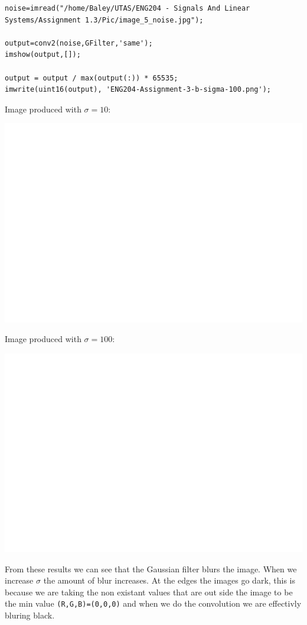 \documentclass[11pt]{article}
\begin{document}
\begin{verbatim}
noise=imread("/home/Baley/UTAS/ENG204 - Signals And Linear Systems/Assignment 1.3/Pic/image_5_noise.jpg");

output=conv2(noise,GFilter,'same');
imshow(output,[]);

output = output / max(output(:)) * 65535;
imwrite(uint16(output), 'ENG204-Assignment-3-b-sigma-100.png');
\end{verbatim}
Image produced with \(\sigma=10\):
\begin{center}
\includegraphics[width=.9\linewidth]{ENG204-Assignment-3-b-sigma-10.png}
\end{center}
Image produced with \(\sigma=100\):
\begin{center}
\includegraphics[width=.9\linewidth]{ENG204-Assignment-3-b-sigma-100.png}
\end{center}
From these results we can see that the Gaussian filter blurs the image. When we increase \(\sigma\) the amount of blur increases.
At the edges the images go dark, this is because we are taking the non existant values that are out side the image to be the min value \texttt{(R,G,B)=(0,0,0)} and when we do the convolution we are effectivly bluring black.
\end{document}

